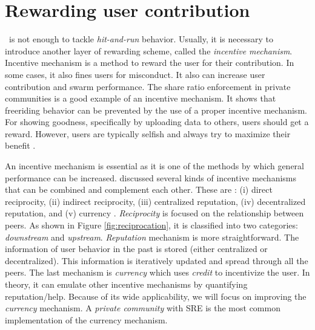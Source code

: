 
\section{Rewarding user contribution}
\label{sec:userreward}

\bt~is not enough to tackle \textit{hit-and-run} behavior. Usually, it is necessary to introduce another layer of rewarding scheme, called the \textit{incentive mechanism}. Incentive mechanism is a method to reward the user for their contribution. In some cases, it also fines users for misconduct. It also can increase user contribution and swarm performance. The share ratio enforcement in private communities is a good example of an incentive mechanism. It shows that freeriding behavior can be prevented by the use of a proper incentive mechanism. For showing goodness, specifically by uploading data to others, users should get a reward. However, users are typically selfish and always try to maximize their benefit \cite{2015:incentivep2pgame:kang}.

An incentive mechanism is essential as it is one of the methods by which general performance can be increased. \citeauthor{2011:managesupplydemand:meulpolder} discussed several kinds of incentive mechanisms that can be combined and complement each other. These are : (i) direct reciprocity, (ii) indirect reciprocity, (iii) centralized reputation, (iv) decentralized reputation, and (v) currency \cite{2011:managesupplydemand:meulpolder}. \textit{Reciprocity} is focused on the relationship between peers. As shown in Figure \ref{fig:reciprocation}, it is classified into two categories: \textit{downstream} and \textit{upstream}. \textit{Reputation} mechanism is more straightforward. The information of user behavior in the past is stored (either centralized or decentralized). This information is iteratively updated and spread through all the peers. The last mechanism is \textit{currency} which uses \textit{credit} to incentivize the user. In theory, it can emulate other incentive mechanisms by quantifying reputation/help. Because of its wide applicability, we will focus on improving the \textit{currency} mechanism.  A \textit{private community} with SRE is the most common implementation of the currency mechanism. 

